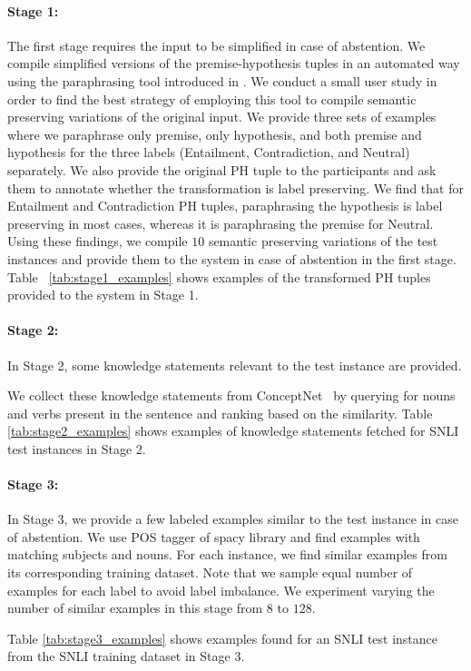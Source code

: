 \documentclass[11pt,a4paper]{article}
\begin{document}
\paragraph{Stage 1:}
The first stage requires the input to be simplified in case of abstention. 
We compile simplified versions of the premise-hypothesis tuples in an automated way using the paraphrasing tool introduced in \cite{zhang2020pegasus}.
We conduct a small user study in order to find the best strategy of employing this tool to compile semantic preserving variations of the original input.
We provide three sets of examples where we paraphrase only premise, only hypothesis, and both premise and hypothesis for the three labels (Entailment, Contradiction, and Neutral) separately.
We also provide the original PH tuple to the participants and ask them to annotate whether the transformation is label preserving.
We find that for Entailment and Contradiction PH tuples, paraphrasing the hypothesis is label preserving in most cases, whereas it is paraphrasing the premise for Neutral. 
Using these findings, we compile $10$ semantic preserving variations of the test instances and provide them to the system in case of abstention in the first stage.
Table ~\ref{tab:stage1_examples} shows examples of the transformed PH tuples provided to the system in Stage 1.



\paragraph{Stage 2:}
In Stage 2, some knowledge statements relevant to the test instance are provided.

We collect these knowledge statements from ConceptNet~\cite{speer2017conceptnet} by querying for nouns and verbs present in the sentence and ranking based on the similarity. 
Table \ref{tab:stage2_examples} shows examples of knowledge statements fetched for SNLI test instances in Stage 2.

\paragraph{Stage 3:}
In Stage 3, we provide a few labeled examples similar to the test instance in case of abstention. We use POS tagger of spacy library \cite{spacy} and find examples with matching subjects and nouns. 
For each instance, we find similar examples from its corresponding training dataset.
Note that we sample equal number of examples for each label to avoid label imbalance.
We experiment varying the number of similar examples in this stage from $8$ to $128$.

Table \ref{tab:stage3_examples} shows examples found for an SNLI test instance from the SNLI training dataset in Stage 3.
\end{document}
